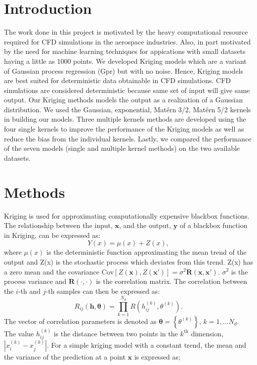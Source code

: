 \documentclass[11pt, letterpaper]{article}
\begin{document}
\section{Introduction} 
	\label{intro}
The work done in this project is motivated by the heavy computational resource required for CFD simulations in the aerospace industries. Also, in part motivated by the need for machine learning techniques for appications with small datasets having a little as 1000 points. We developed Kriging models which are a variant of Gaussian process regression (Gpr) but with no noise. Hence, Kriging models are best suited for deterministic data obtainable in CFD simulations. CFD simulations are considered deterministic because same set of input will give same output. Our Kriging methods models the output as a realization of a Gaussian distribution. We used the Gaussian, exponential, Mat\'ern 3/2, Mat\'ern 5/2 kernels in building our models. Three multiple kernels methods are developed using the four single kernels to improve the performance of the Kriging models as well as reduce the bias from the individual kernels. Lastly, we compared the performance of the seven models (single and multiple kernel methods) on the two available datasets.

\section{Methods}
Kriging is used for approximating computationally expensive blackbox functions. The relationship between the input, $\boldsymbol{x}$, and the output, $\boldsymbol{y}$ of a blackbox function in Kriging, can be expressed as:
\begin{equation}
\label{kriging_eqn}
Y(x) = \mu(x) + Z(x),
\end{equation}
where $\mu(x)$ is the deterministic function approximating the mean trend of the output and Z(x) is the stochastic process which deviates from this trend. Z(x) has a zero mean and the covariance
$\text{Cov}\left[Z\left(\mathbf{x}\right),Z\left(\mathbf{x}'\right)\right]
= \sigma^2\mathbf{R}\left(\mathbf{x}, \mathbf{x}'\right)$. $\sigma^2$
is the process variance and $\mathbf{R}\left(\cdot, \cdot\right)$ is the
correlation matrix. The correlation
between the $i$-th and $j$-th samples can then be expressed as:
\begin{equation}
R_{ij}\left(\boldsymbol{h , \theta}\right) = \prod_{k=1}^{N_d}{R\left(h_{ij}^{\left(k\right)},\theta^{\left(k\right)}\right)}.
\label{eq:corrProduct}
\end{equation}
The vector of correlation parameters is denoted as
$\boldsymbol{\theta} = \left\{\theta^{\left(k\right)}\right\}, \, k=1,
\ldots N_d$. The value $h_{ij}^{\left(k\right)}$ is the distance
between two points in the $k^{\text{th}}$ dimension,
$\left|x_i^{\left(k\right)} - x_j^{\left(k\right)}\right|$.
For a simple kriging model with a constant trend, the mean and the variance of the prediction at a point $\boldsymbol{x}$ is expressed as;
\end{document}
